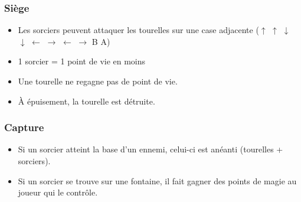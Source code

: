 \documentclass{beamer}
\begin{document}
\begin{frame}
	\frametitle{Siège}
	\begin{itemize}
	\item Les sorciers peuvent attaquer les tourelles sur une case adjacente ($\uparrow$ $\uparrow$ $\downarrow$ $\downarrow$ $\leftarrow$ $\rightarrow$ $\leftarrow$ $\rightarrow$ B A)
	\item 1 sorcier = 1 point de vie en moins
	\item Une tourelle ne regagne pas de point de vie.
	\item À épuisement, la tourelle est détruite.
	\end{itemize}
\end{frame}

\begin{frame}
	\frametitle{Capture}
	\begin{itemize}
	\item Si un sorcier atteint la base d'un ennemi, celui-ci est anéanti (tourelles + sorciers).
	\item Si un sorcier se trouve sur une fontaine, il fait gagner des points de magie au joueur qui le contrôle.
	\end{itemize}
\end{frame}
\end{document}
